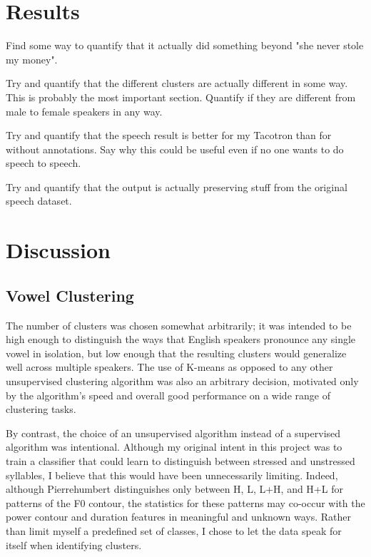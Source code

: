 \documentclass{article}
\begin{document}
\section{Results}
\label{sec:results}

Find some way to quantify that it actually did something beyond "she never stole my money".

Try and quantify that the different clusters are actually different in some way. This is probably the most important section. Quantify if they are different from male to female speakers in any way.

Try and quantify that the speech result is better for my Tacotron than for without annotations. Say why this could be useful even if no one wants to do speech to speech.

Try and quantify that the output is actually preserving stuff from the original speech dataset.

\section{Discussion}
\label{sec:discussion}

\subsection{Vowel Clustering}
\label{ssec:discussvowels}

The number of clusters was chosen somewhat arbitrarily; it was intended to be high enough to distinguish the ways that English speakers pronounce any single vowel in isolation, but low enough that the resulting clusters would generalize well across multiple speakers.
The use of K-means as opposed to any other unsupervised clustering algorithm was also an arbitrary decision, motivated only by the algorithm's speed and overall good performance on a wide range of clustering tasks.

By contrast, the choice of an unsupervised algorithm instead of a supervised algorithm was intentional.
Although my original intent in this project was to train a classifier that could learn to distinguish between stressed and unstressed syllables, I believe that this would have been unnecessarily limiting.
Indeed, although Pierrehumbert \cite{pierrehumbert1980phonology} distinguishes only between H, L, L+H, and H+L for patterns of the F0 contour, the statistics for these patterns may co-occur with the power contour and duration features in meaningful and unknown ways. Rather than limit myself a predefined set of classes, I chose to let the data speak for itself when identifying clusters.
\end{document}
